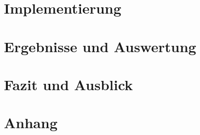 \documentclass[enabledeprecatedfontcommands,12pt,a4paper,twoside,hyphens]{scrreprt}
\begin{document}
\chapter{Implementierung}

\cleardoublepage

\chapter{Ergebnisse und Auswertung}

\cleardoublepage

\chapter{Fazit und Ausblick}

\cleardoublepage





\chapter{Anhang}

\cleardoublepage

\newpage
\listoffigures
\end{document}
